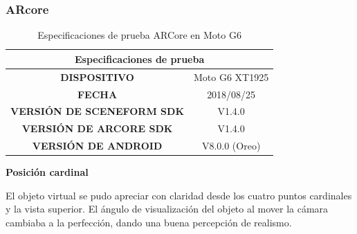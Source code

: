 \subsubsection{ARcore}
\begin{table}[H]
	\centering
	\begin{tabular}{|c|c|}
		\hline
		\multicolumn{2}{|c|}{Especificaciones de prueba}   \\ \hline
		\textbf{DISPOSITIVO}              & Moto G6 XT1925 \\ \hline
		\textbf{FECHA}                    & 2018/08/25     \\ \hline
		\textbf{VERSIÓN DE SCENEFORM SDK} & V1.4.0         \\ \hline
		\textbf{VERSIÓN DE ARCORE SDK}    & V1.4.0         \\ \hline
		\textbf{VERSIÓN DE ANDROID}       & V8.0.0 (Oreo)  \\ \hline
	\end{tabular}
	\captionsetup{justification=centering}
	\caption{Especificaciones de prueba ARCore en Moto G6}
\end{table}

\textbf{Posición cardinal} \par
El objeto virtual se pudo apreciar con claridad desde los cuatro puntos cardinales y la vista superior. El ángulo de visualización del objeto al mover la cámara cambiaba a la perfección, dando una buena percepción de realismo.

